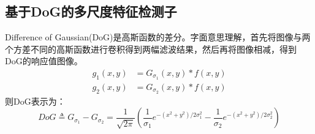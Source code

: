 \subsection{基于DoG的多尺度特征检测子}
Difference of Gaussian(DoG)是高斯函数的差分。字面意思理解，首先将图像与两个方差不同的高斯函数进行卷积得到两幅滤波结果，然后再将图像相减，得到DoG的响应值图像。
\begin{equation}
\begin{aligned} g_{1}(x, y) &=G_{\sigma_{1}}(x, y) * f(x, y) \\ g_{2}(x, y) &=G_{\sigma_{2}}(x, y) * f(x, y) \end{aligned}
\end{equation}
则DoG表示为：
\begin{equation}
D o G \triangleq G_{\sigma_{1}}-G_{\sigma_{2}}=\frac{1}{\sqrt{2 \pi}}\left(\frac{1}{\sigma_{1}} e^{-\left(x^{2}+y^{2}\right) / 2 \sigma_{1}^{2}}-\frac{1}{\sigma_{2}} e^{-\left(x^{2}+y^{2}\right) / 2 \sigma_{2}^{2}}\right)
\end{equation}
